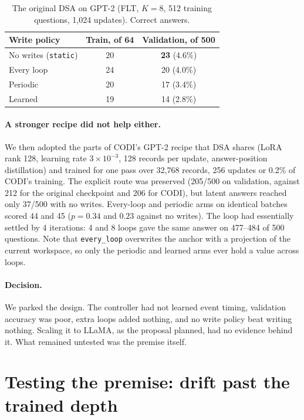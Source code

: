 \documentclass[11pt]{article}
\newcommand{\pol}[1]{\texttt{#1}}
\begin{document}
\begin{table}[t]
\centering
\small
\begin{tabular}{lcc}
\toprule
Write policy & Train, of 64 & Validation, of 500 \\
\midrule
No writes (\pol{static}) & 20 & \textbf{23} (4.6\%) \\
Every loop & 24 & 20 (4.0\%) \\
Periodic & 20 & 17 (3.4\%) \\
Learned & 19 & 14 (2.8\%) \\
\bottomrule
\end{tabular}
\caption{The original DSA on GPT-2 (FLT, $K = 8$, 512 training questions, 1,024 updates). Correct answers.}
\label{tab:datascale}
\end{table}

\paragraph{A stronger recipe did not help either.} We then adopted the parts of CODI's GPT-2 recipe that DSA shares (LoRA rank
128, learning rate $3 \times 10^{-3}$, 128 records per update, answer-position distillation) and trained for one pass over
32,768 records, 256 updates or 0.2\% of CODI's training. The explicit route was preserved (205/500 on validation, against
212 for the original checkpoint and 206 for CODI), but latent answers reached only 37/500 with no writes. Every-loop and
periodic arms on identical batches scored 44 and 45 ($p = 0.34$ and $0.23$ against no writes). The loop had essentially
settled by 4 iterations: 4 and 8 loops gave the same answer on 477--484 of 500 questions. Note that \pol{every\_loop} overwrites the anchor with a projection of the current workspace, so only
the periodic and learned arms ever hold a value across loops.

\paragraph{Decision.} We parked the design. The controller had not learned event timing, validation accuracy was poor, extra
loops added nothing, and no write policy beat writing nothing. Scaling it to LLaMA, as the proposal planned, had no evidence
behind it. What remained untested was the premise itself.

\section{Testing the premise: drift past the trained depth}
\label{sec:premise}
\end{document}
